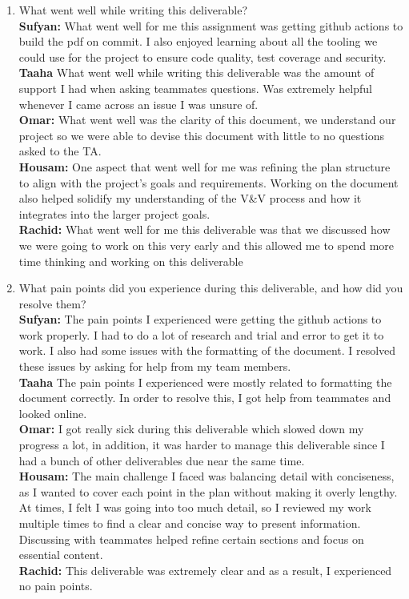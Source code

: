 \documentclass[12pt, titlepage]{article}
\begin{document}
\begin{enumerate}
  \item What went well while writing this deliverable? \\
  \textbf{Sufyan:} What went well for me this assignment was getting github actions to build the pdf on commit. I also enjoyed learning about all the tooling we could use for the project to ensure code quality, test coverage and security. \\
  \textbf{Taaha} What went well while writing this deliverable was the amount of support I had when asking teammates questions. Was extremely helpful whenever I came across an issue I was unsure of. \\
  \textbf{Omar:} What went well was the clarity of this document, we understand our project so we were able to devise this document with little to no questions asked to the TA. \\
  \textbf{Housam:} One aspect that went well for me was refining the plan structure to align with the project’s goals and requirements. Working on the document also helped solidify my understanding of the V\&V process and how it integrates into the larger project goals. \\
  \textbf{Rachid:} What went well for me this deliverable was that we discussed how we were going to work on this very early and this allowed me to spend more time thinking and working on this deliverable

  \item What pain points did you experience during this deliverable, and how
    did you resolve them? \\
  \textbf{Sufyan:} The pain points I experienced were getting the github actions to work properly. I had to do a lot of research and trial and error to get it to work. I also had some issues with the formatting of the document. I resolved these issues by asking for help from my team members. \\
  \textbf{Taaha} The pain points I experienced were mostly related to formatting the document correctly. In order to resolve this, I got help from teammates and looked online. \\
  \textbf{Omar:} I got really sick during this deliverable which slowed down my progress a lot, in addition, it was harder to manage this deliverable since I had a bunch of other deliverables due near the same time. \\
  \textbf{Housam:} The main challenge I faced was balancing detail with conciseness, as I wanted to cover each point in the plan without making it overly lengthy. At times, I felt I was going into too much detail, so I reviewed my work multiple times to find a clear and concise way to present information. Discussing with teammates helped refine certain sections and focus on essential content. \\
  \textbf{Rachid:} This deliverable was extremely clear and as a result, I experienced no pain points.


\end{enumerate}
\end{document}
